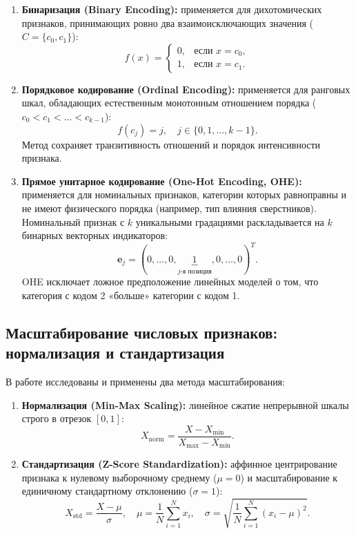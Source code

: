 \documentclass[14pt,a4paper]{extarticle}
\begin{document}
\begin{enumerate}
    \item \textbf{Бинаризация (Binary Encoding):} применяется для дихотомических признаков, принимающих ровно два взаимоисключающих значения ($C = \{c_0, c_1\}$):
    \begin{equation}
        f(x) = \begin{cases} 0, & \text{если } x = c_0, \\ 1, & \text{если } x = c_1. \end{cases}
    \end{equation}
    \item \textbf{Порядковое кодирование (Ordinal Encoding):} применяется для ранговых шкал, обладающих естественным монотонным отношением порядка ($c_0 < c_1 < \dots < c_{k-1}$):
    \begin{equation}
        f(c_j) = j, \quad j \in \{0, 1, \dots, k-1\}.
    \end{equation}
    Метод сохраняет транзитивность отношений и порядок интенсивности признака.
    \item \textbf{Прямое унитарное кодирование (One-Hot Encoding, OHE):} применяется для номинальных признаков, категории которых равноправны и не имеют физического порядка (например, тип влияния сверстников). Номинальный признак с $k$ уникальными градациями раскладывается на $k$ бинарных векторных индикаторов:
    \begin{equation}
        \mathbf{e}_j = (0, \dots, 0, \underbrace{1}_{j\text{-я позиция}}, 0, \dots, 0)^T.
    \end{equation}
    OHE исключает ложное предположение линейных моделей о том, что категория с кодом 2 «больше» категории с кодом 1.
\end{enumerate}

\subsection{Масштабирование числовых признаков: нормализация и стандартизация}

В работе исследованы и применены два метода масштабирования:
\begin{enumerate}
    \item \textbf{Нормализация (Min-Max Scaling):} линейное сжатие непрерывной шкалы строго в отрезок $[0, 1]$:
    \begin{equation}
        X_{\text{norm}} = \frac{X - X_{\min}}{X_{\max} - X_{\min}}.
    \end{equation}
    \item \textbf{Стандартизация (Z-Score Standardization):} аффинное центрирование признака к нулевому выборочному среднему ($\mu = 0$) и масштабирование к единичному стандартному отклонению ($\sigma = 1$):
    \begin{equation}
        X_{\text{std}} = \frac{X - \mu}{\sigma}, \quad \mu = \frac{1}{N}\sum_{i=1}^N x_i, \quad \sigma = \sqrt{\frac{1}{N}\sum_{i=1}^N (x_i - \mu)^2}.
    \end{equation}
\end{enumerate}
\end{document}
